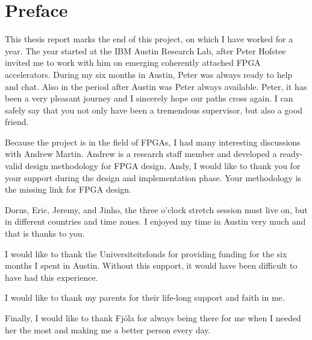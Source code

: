 \chapter*{Preface}

This thesis report marks the end of this project, on which I have worked for a year. The year started at the IBM Austin Research Lab, after Peter Hofstee invited me to work with him on emerging coherently attached FPGA accelerators. During my six months in Austin, Peter was always ready to help and chat. Also in the period after Austin was Peter always available. Peter, it has been a very pleasant journey and I sincerely hope our paths cross again. I can safely say that you not only have been a tremendous supervisor, but also a good friend.

Because the project is in the field of FPGAs, I had many interesting discussions with Andrew Martin. Andrew is a research staff member and developed a ready-valid design methodology for FPGA design. Andy, I would like to thank you for your support during the design and implementation phase. Your methodology is the missing link for FPGA design.

Dorus, Eric, Jeremy, and Jinho, the three o'clock stretch session must live on, but in different countries and time zones. I enjoyed my time in Austin very much and that is thanks to you.

I would like to thank the Universiteitsfonds for providing funding for the six months I spent in Austin. Without this support, it would have been difficult to have had this experience.

I would like to thank my parents for their life-long support and faith in me.

Finally, I would like to thank Fjóla for always being there for me when I needed her the most and making me a better person every day.
